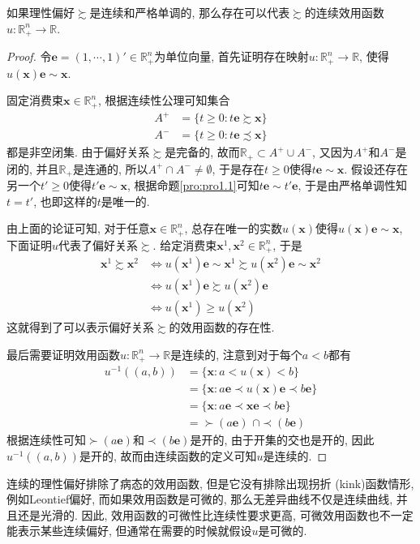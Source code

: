 \documentclass[cn, 12pt, math=mtpro2, bibstyle=apa, blue, twocol]{elegantbook}
\newcommand{\R}{\mathbb{R}}
\newcommand{\x}{\mathbf{x}}
\begin{document}
\begin{theorem}\label{thm:thm1.1}
  如果理性偏好$\succsim$是连续和严格单调的, 那么存在可以代表$\succsim$的连续效用函数$u:\R^n_+\to\R$.
\end{theorem}
\begin{proof}
  令$\mathbf{e}=(1,\cdots,1)'\in\R^n_+$为单位向量, 首先证明存在映射$u:\R^n_+\to\R$, 使得$u(\x)\mathbf{e}\sim \x$.

  固定消费束$\x\in\R^n_+$, 根据连续性公理可知集合
  \begin{align*}
  A^+&=\{t\ge0: t\mathbf{e}\succsim \x\} \\
  A^-&=\{t\ge0: t\mathbf{e}\precsim \x\}
  \end{align*}
  都是非空闭集. 由于偏好关系$\succsim$是完备的, 故而$\R_+\subset A^+\cup A^-$, 又因为$A^+$和$A^-$是闭的, 并且$\R_+$是连通的, 所以$A^+\cap A^-\neq\emptyset$, 于是存在$t\ge0$使得$t\mathbf{e}\sim \x$. 假设还存在另一个$t'\ge0$使得$t'\mathbf{e}\sim \x$, 根据命题\ref{pro:pro1.1}可知$t\mathbf{e}\sim t'\mathbf{e}$, 于是由严格单调性知$t=t'$, 也即这样的$t$是唯一的.

  由上面的论证可知, 对于任意$\x\in\mathbb{R}_+^n$, 总存在唯一的实数$u(\x)$使得$u(\x)\mathbf{e}\sim\x$, 下面证明$u$代表了偏好关系$\succsim$. 给定消费束$\x^1, \x^2\in\R_+^n$, 于是
  \begin{align*}
  \x^1\succsim\x^2&\Leftrightarrow u(\x^1)\mathbf{e}\sim \x^1\succsim u(\x^2)\mathbf{e}\sim \x^2 \\
  &\Leftrightarrow u(\x^1)\mathbf{e}\succsim u(\x^2)\mathbf{e} \\
  &\Leftrightarrow u(\x^1)\ge u(\x^2)
  \end{align*}
  这就得到了可以表示偏好关系$\succsim$的效用函数的存在性.

  最后需要证明效用函数$u:\R^n_+\to \R$是连续的, 注意到对于每个$a<b$都有
  \begin{align*}
  u^{-1}((a,b))&=\{\x: a<u(\x)<b\} \\
  &=\{\x: a\mathbf{e}\prec u(\x)\mathbf{e}\prec b\mathbf{e}\} \\
  &=\{\x: a\mathbf{e}\prec \x\mathbf{e}\prec b\mathbf{e}\} \\
  &=\succ (a\mathbf{e})\,\,\cap \prec(b\mathbf{e})
  \end{align*}
  根据连续性可知$\succ(a\mathbf{e})$和$\prec(b\mathbf{e})$是开的, 由于开集的交也是开的, 因此$u^{-1}((a,b))$是开的, 故而由连续函数的定义可知$u$是连续的.
\end{proof}

连续的理性偏好排除了病态的效用函数, 但是它没有排除出现拐折 (kink)函数情形, 例如Leontief偏好, 而如果效用函数是可微的, 那么无差异曲线不仅是连续曲线, 并且还是光滑的. 因此, 效用函数的可微性比连续性要求更高, 可微效用函数也不一定能表示某些连续偏好, 但通常在需要的时候就假设$u$是可微的.
\end{document}

